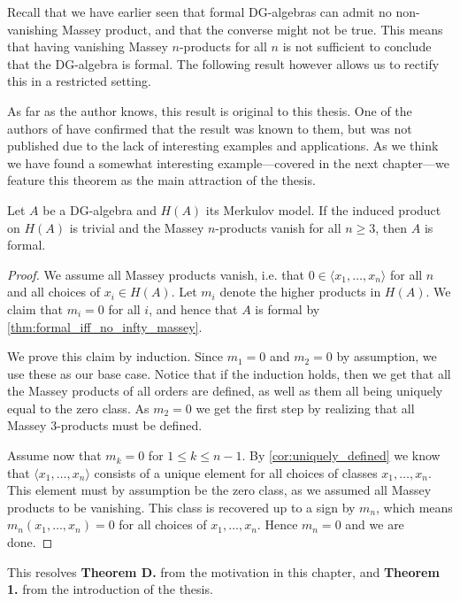 Recall that we have earlier seen that formal DG-algebras can admit no non-vanishing Massey product, and that the converse might not be true. This means that having vanishing Massey $n$-products for all $n$ is not sufficient to conclude that the DG-algebra is formal. The following result however allows us to rectify this in a restricted setting. 

As far as the author knows, this result is original to this thesis. One of the authors of \cite{detection} have confirmed that the result was known to them, but was not published due to the lack of interesting examples and applications. As we think we have found a somewhat interesting example---covered in the next chapter---we feature this theorem as the main attraction of the thesis. 

\begin{theorem}
\label{thm:cuptrivial_no_massey_then_formal}
Let $A$ be a DG-algebra and $H(A)$ its Merkulov model. If the induced product on $H(A)$ is trivial and the Massey $n$-products vanish for all $n\geq 3$, then $A$ is formal. 
\end{theorem}
\begin{proof}
We assume all Massey products vanish, i.e. that $0\in \langle x_1, \ldots, x_n\rangle $ for all $n$ and all choices of $x_i\in H(A)$. Let $m_i$ denote the higher products in $H(A)$. We claim that $m_i = 0$ for all $i$, and hence that $A$ is formal by \cref{thm:formal_iff_no_infty_massey}. 

We prove this claim by induction. Since $m_1 = 0$ and $m_2 = 0$ by assumption, we use these as our base case. Notice that if the induction holds, then we get that all the Massey products of all orders are defined, as well as them all being uniquely equal to the zero class. As $m_2=0$ we get the first step by realizing that all Massey 3-products must be defined. 

Assume now that $m_k = 0$ for $1\leq k\leq n-1$. By \cref{cor:uniquely_defined} we know that $\langle x_1, \ldots, x_n \rangle$ consists of a unique element for all choices of classes $x_1, \ldots, x_n$. This element must by assumption be the zero class, as we assumed all Massey products to be vanishing. This class is recovered up to a sign by $m_n$, which means $m_n(x_1,\ldots, x_n)=0$ for all choices of $x_1, \ldots, x_n$. Hence $m_n=0$ and we are done. 
\end{proof}

This resolves \textbf{Theorem D.} from the motivation in this chapter, and \textbf{Theorem 1.} from the introduction of the thesis. 

